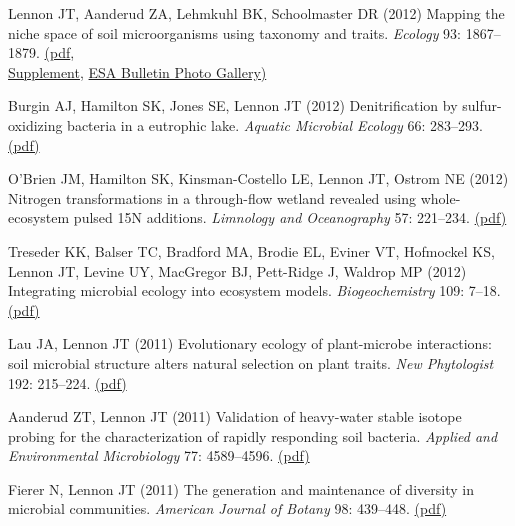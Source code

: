 \documentclass[11pt]{article}
\begin{document}
\begin{etaremune}
\item Lennon JT, Aanderud ZA, Lehmkuhl BK, Schoolmaster DR (2012) Mapping the niche space of soil microorganisms using taxonomy and traits. \textit{Ecology} 93: 1867–1879. \href{https://lennonlab.github.io/assets/publications/Lennon_etal_2012.pdf}{(pdf}, \\ \href{https://esapubs.org/archive/ecol/E093/165/}{Supplement}, \href{https://lennonlab.github.io/assets/publications/Lennon_etal_2012_ESABull.pdf}{ESA Bulletin Photo Gallery)}

\item Burgin AJ, Hamilton SK, Jones SE, Lennon JT (2012) Denitrification by sulfur-oxidizing bacteria in a eutrophic lake. \textit{Aquatic Microbial Ecology} 66: 283–293. \href{https://lennonlab.github.io/assets/publications/Burgin_etal_2012.pdf}{(pdf)}

\item O'Brien JM, Hamilton SK, Kinsman-Costello LE, Lennon JT, Ostrom NE (2012) Nitrogen transformations in a through-flow wetland revealed using whole-ecosystem pulsed 15N additions. \textit{Limnology and Oceanography} 57: 221–234. \href{https://lennonlab.github.io/assets/publications/OBrien_etal_2012.pdf}{(pdf)}

\item Treseder KK, Balser TC, Bradford MA, Brodie EL, Eviner VT, Hofmockel KS, Lennon JT, Levine UY, MacGregor BJ, Pett-Ridge J, Waldrop MP (2012) Integrating microbial ecology into ecosystem models. \textit{Biogeochemistry} 109: 7–18. \href{https://lennonlab.github.io/assets/publications/Treseder_etal_2012.pdf}{(pdf)}

\item Lau JA, Lennon JT (2011) Evolutionary ecology of plant-microbe interactions: soil microbial structure alters natural selection on plant traits. \textit{New Phytologist} 192: 215–224. \href{https://lennonlab.github.io/assets/publications/Lau_Lennon_2011.pdf}{(pdf)}

\item Aanderud ZT, Lennon JT (2011) Validation of heavy-water stable isotope probing for the characterization of rapidly responding soil bacteria. \textit{Applied and Environmental Microbiology} 77: 4589–4596. \href{https://lennonlab.github.io/assets/publications/Aanderud_Lennon_2011.pdf}{(pdf)}

\item Fierer N, Lennon JT (2011) The generation and maintenance of diversity in microbial communities. \textit{American Journal of Botany} 98: 439–448. \href{https://lennonlab.github.io/assets/publications/Fierer_Lennon_2011.pdf}{(pdf)}


\end{etaremune}
\end{document}
